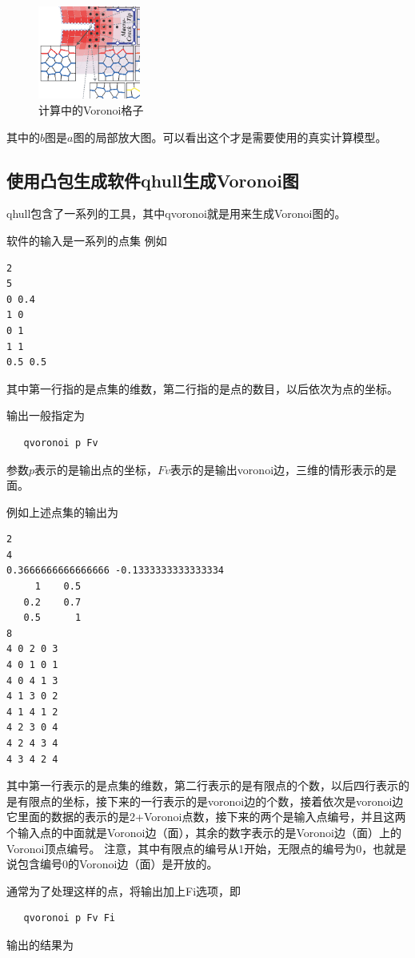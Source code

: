 \begin{figure}[htbp]
	\begin{center}
		\includegraphics[width=0.3\textwidth]{pics/Micro_structure.eps}
	\end{center}
	\caption{计算中的Voronoi格子}
	\label{fig:vri}
\end{figure}
其中的$b$图是$a$图的局部放大图。可以看出这个才是需要使用的真实计算模型。

\subsection{使用凸包生成软件qhull生成Voronoi图}
qhull包含了一系列的工具，其中qvoronoi就是用来生成Voronoi图的。

软件的输入是一系列的点集
例如
\begin{verbatim}
2
5
0 0.4
1 0
0 1
1 1
0.5 0.5
\end{verbatim}
其中第一行指的是点集的维数，第二行指的是点的数目，以后依次为点的坐标。

输出一般指定为 
\begin{verbatim}
   qvoronoi p Fv
\end{verbatim}

参数$p$表示的是输出点的坐标，$Fv$表示的是输出voronoi边，三维的情形表示的是面。

例如上述点集的输出为
\begin{verbatim}
2
4
0.3666666666666666 -0.1333333333333334 
     1    0.5 
   0.2    0.7 
   0.5      1 
8
4 0 2 0 3
4 0 1 0 1
4 0 4 1 3
4 1 3 0 2
4 1 4 1 2
4 2 3 0 4
4 2 4 3 4
4 3 4 2 4
\end{verbatim}

其中第一行表示的是点集的维数，第二行表示的是有限点的个数，以后四行表示的是有限点的坐标，接下来的一行表示的是voronoi边的个数，接着依次是voronoi边
它里面的数据的表示的是2+Voronoi点数，接下来的两个是输入点编号，并且这两个输入点的中面就是Voronoi边（面），其余的数字表示的是Voronoi边（面）上的Voronoi顶点编号。
注意，其中有限点的编号从1开始，无限点的编号为0，也就是说包含编号0的Voronoi边（面）是开放的。

通常为了处理这样的点，将输出加上Fi选项，即
\begin{verbatim}
   qvoronoi p Fv Fi
\end{verbatim}
输出的结果为


